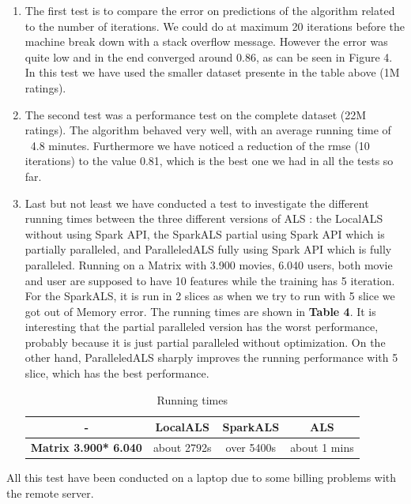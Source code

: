 \documentclass{sig-alternate-05-2015}
\begin{document}
\begin{enumerate}
    \item The first test is to compare the error on predictions of the algorithm related to the number of iterations.
        We could do at maximum 20 iterations before the machine break down with a stack overflow message. However the error
        was quite low and in the end converged around 0.86, as can be seen in Figure 4. In this test we have used the smaller
        dataset presente in the table above (1M ratings).
    \item The second test was a performance test on the complete dataset (22M ratings). The algorithm behaved very well, with an average
    running time of ~4.8 minutes. Furthermore we have noticed a reduction of the rmse (10 iterations) to the value 0.81, which is the best one
    we had in all the tests so far.
    \item Last but not least we have conducted a test to investigate the different running times between the three different versions of ALS : the LocalALS without using Spark API, the SparkALS partial using Spark API which is partially paralleled, and ParalleledALS fully using Spark API which is fully paralleled. Running on a Matrix with 3.900 movies, 6.040 users, both movie and user are supposed to have 10 features while the training has 5 iteration. For the SparkALS, it is run in 2 slices as when we try to run with 5 slice we got out of Memory error. The running times are shown in \textbf{Table 4}. It is interesting that the partial paralleled version has the worst performance, probably because it is just partial paralleled without optimization. On the other hand, ParalleledALS sharply improves the running performance with 5 slice, which has the best performance. 
\begin{table}
\centering
\caption{Running times}
\begin{tabular}{|c|c|c|c|} \hline
-  & \textbf{LocalALS} & \textbf{SparkALS} & \textbf{ALS }\\ \hline
\textbf{Matrix 3.900* 6.040} & about 2792s  & over 5400s & about 1 mins\\ \hline
\end{tabular}
\end{table}
\end{enumerate}
All this test have been conducted on a laptop due to some billing problems with the remote server.
\end{document}
